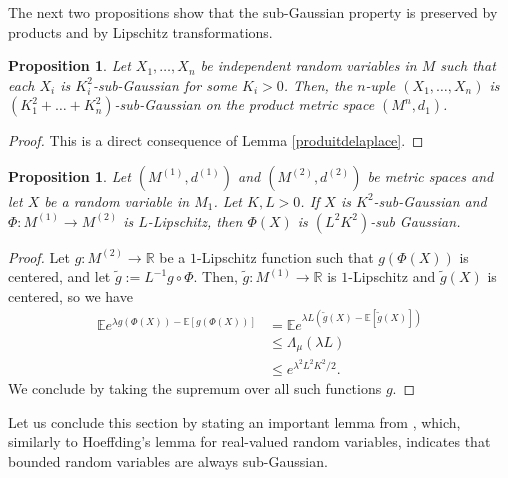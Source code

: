 \documentclass[10pt,a4paper]{article}
\theoremstyle{plain}
\newtheorem{proposition}[theorem]{Proposition}
\theoremstyle{definition}
\theoremstyle{remark}
\newcommand{\R}{\mathbb{R}}
\newcommand{\E}{\mathbb{E}}
\begin{document}
The next two propositions show that the sub-Gaussian property is preserved by products and by Lipschitz transformations.



\begin{proposition}\label{produitsousgaussien}
Let $X_1,\ldots,X_n$ be independent random variables in $M$ such that each $X_i$ is $K_i^2$-sub-Gaussian for some $K_i>0$. Then, the $n$-uple $(X_1,\ldots,X_n)$ is $(K_1^2+\ldots+K_n^2)$-sub-Gaussian on the product metric space $(M^n, d_1)$.
\end{proposition}
\begin{proof}
This is a direct consequence of Lemma \ref{produitdelaplace}.
\end{proof}

\begin{proposition}\label{lipsousgauss}
Let $(M^{(1)},d^{(1)})$ and $(M^{(2)},d^{(2)})$ be metric spaces and let $X$ be a random variable in $M_1$. Let $K,L>0$. If $X$ is $K^2$-sub-Gaussian and $\Phi:M^{(1)}\to M^{(2)}$ is $L$-Lipschitz, then $\Phi(X)$ is $(L^2K^2)$-sub Gaussian.
\end{proposition}

\begin{proof}
Let $g:M^{(2)}\rightarrow\R$ be a $1$-Lipschitz function such that $g(\Phi(X))$ is centered, and let $\tilde g:=L^{-1}g\circ\Phi$. Then, $\tilde g:M^{(1)}\rightarrow\R$ is $1$-Lipschitz and $\tilde g (X)  $ is centered, so we have
\begin{align*}
\E e^{\lambda g(\Phi(X))-\E[g(\Phi(X))]} & = \E e^{\lambda L(\tilde g(X)-\E[\tilde g(X)])} \\
& \leq \Lambda_\mu(\lambda L)\\
& \leq e^{\lambda^2L^2K^2/2}.
\end{align*}
We conclude by taking the supremum over all such functions $g$.
\end{proof}

\vspace{-2mm}

Let us conclude this section by stating an important lemma from \cite{Ledouxconcentration}, which, similarly to Hoeffding's lemma for real-valued random variables, indicates that bounded random variables are always sub-Gaussian.
\end{document}
